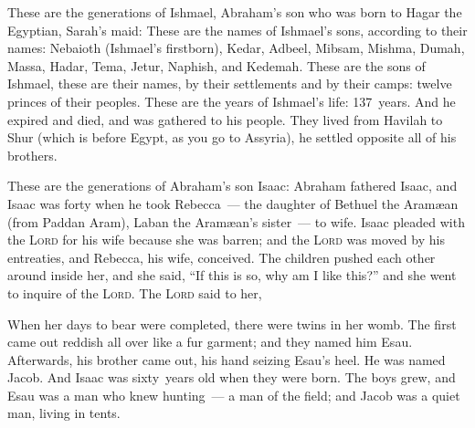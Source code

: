 \begin{inparaenum}
     These are the generations of Ishmael, Abraham's son who was born to Hagar the Egyptian, Sarah's maid:%
     These are the names of Ishmael's sons, according to their names: Nebaioth (Ishmael's firstborn), Kedar, Adbeel, Mibsam,%
     Mishma, Dumah, Massa,%
     Hadar, Tema, Jetur, Naphish, and Kedemah.%
     These are the sons of Ishmael, these are their names, by their settlements and by their camps: twelve princes of their peoples.%
     These are the years of Ishmael's life: 137~years. And he expired and died, and was gathered to his people.%
     They lived from Havilah to Shur (which is before Egypt, as you go to Assyria), he settled opposite all of his brothers.%
    
     These are the generations of Abraham's son Isaac: Abraham fathered Isaac,%
     and Isaac was forty when he took Rebecca~--- the daughter of Bethuel the Aram\ae an (from Paddan Aram), Laban the Aram\ae an's sister~--- to wife.%
     Isaac pleaded with the \textsc{Lord} for his wife because she was barren; and the \textsc{Lord} was moved by his entreaties, and Rebecca, his wife, conceived.%
     The children pushed each other around inside her, and she said, ``If this is so, why am I like this?'' and she went to inquire of the \textsc{Lord}.%
     The \textsc{Lord} said to her,\smallskip%
    
    
    
     When her days to bear were completed, there were twins in her womb.%
     The first came out reddish all over like a fur garment; and they named him Esau.%
     Afterwards, his brother came out, his hand seizing Esau's heel. He was named Jacob. And Isaac was sixty~years old when they were born.%
     The boys grew, and Esau was a man who knew hunting~--- a man of the field; and Jacob was a quiet man, living in tents.%
\end{inparaenum}
